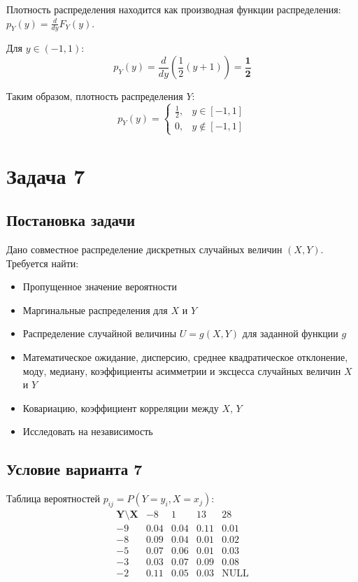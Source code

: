 \documentclass[a4paper,14pt]{extarticle}
\begin{document}
    Плотность распределения находится как производная функции распределения: $p_Y(y) = \frac{d}{dy} F_Y(y)$.

    Для $y \in (-1, 1)$:
    $$
    p_Y(y) = \frac{d}{dy} \left( \frac{1}{2}(y + 1) \right) = \mathbf{\frac{1}{2}}
    $$

    Таким образом, плотность распределения $Y$:
    $$
    \boxed{p_Y(y) = \begin{cases} 
    \frac{1}{2}, & y \in [-1, 1] \\
    0, & y \notin [-1, 1]
    \end{cases}}
    $$

    \section*{Задача 7}
        \subsection*{Постановка задачи}
        Дано совместное распределение дискретных случайных величин $(X, Y )$. Требуется найти:
        \begin{itemize}
            \item Пропущенное значение вероятности
            \item Маргинальные распределения для $X$ и $Y$
            \item Распределение случайной величины $U = g(X, Y)$ для заданной функции $g$
            \item Математическое ожидание, дисперсию, среднее квадратическое отклонение, моду, медиану, коэффициенты асимметрии и эксцесса случайных величин $X$ и $Y$
            \item Ковариацию, коэффициент корреляции между $X$, $Y$
            \item Исследовать на независимость
        \end{itemize}
        \subsection*{Условие варианта 7}
        Таблица вероятностей $p_{ij} = P(Y=y_i, X=x_j)$:
        \[
        \begin{array}{c|cccc}
        \mathbf{Y \setminus X} & -8 & 1 & 13 & 28 \\
        \hline
        -9 & 0.04 & 0.04 & 0.11 & 0.01  \\
        -8 & 0.09 & 0.04 & 0.01 & 0.02  \\
        -5 & 0.07 & 0.06 & 0.01 & 0.03  \\
        -3 & 0.03 & 0.07 & 0.09 & 0.08  \\
        -2 & 0.11 & 0.05 & 0.03 & \text{NULL}  \\
        \end{array}
        \]
\end{document}
